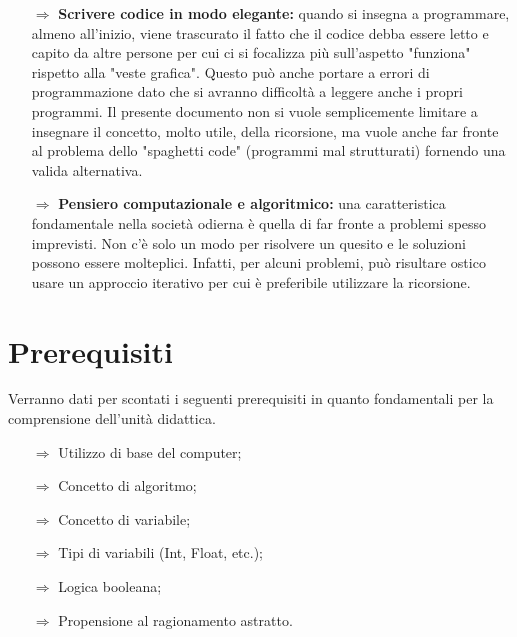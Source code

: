 \begin{itemize}
    \item [$\Rightarrow$] \textbf{Scrivere codice in modo elegante:} quando si insegna
    a programmare, almeno all'inizio, viene trascurato il fatto che il codice debba essere
    letto e capito da altre persone per cui ci si focalizza più sull'aspetto "funziona" rispetto
    alla "veste grafica". Questo può anche portare a errori di programmazione dato che si avranno
    difficoltà a leggere anche i propri programmi. Il presente documento non si vuole semplicemente
    limitare a insegnare il concetto, molto utile, della ricorsione, ma vuole anche far fronte al
    problema dello "spaghetti code" (programmi mal strutturati) fornendo una valida alternativa.
    \item [$\Rightarrow$] \textbf{Pensiero computazionale e algoritmico:} una caratteristica fondamentale
    nella società odierna è quella di far fronte a problemi spesso imprevisti. Non c'è solo un modo per
    risolvere un quesito e le soluzioni possono essere molteplici. Infatti, per alcuni problemi, può
    risultare ostico usare un approccio iterativo per cui è preferibile utilizzare la ricorsione.
\end{itemize}

\section{Prerequisiti}

Verranno dati per scontati i seguenti prerequisiti in quanto fondamentali per la comprensione dell'unità didattica.

\begin{itemize}
    \item [$\Rightarrow$] Utilizzo di base del computer;
    \item [$\Rightarrow$] Concetto di algoritmo;
    \item [$\Rightarrow$] Concetto di variabile;
    \item [$\Rightarrow$] Tipi di variabili (Int, Float, etc.);
    \item [$\Rightarrow$] Logica booleana;
    \item [$\Rightarrow$] Propensione al ragionamento astratto.
\end{itemize}
\paragraph{}


